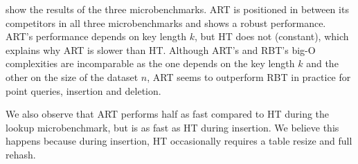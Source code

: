 \documentclass[abstracton,12pt]{scrartcl}
\theoremstyle{definition}
\begin{document}
show the results of the three microbenchmarks. ART is positioned in between 
its competitors in all three microbenchmarks and shows a robust performance.
ART's performance depends on key length $k$, but HT does not (constant), which 
explains why ART is slower than HT. Although ART's and RBT's big-O complexities 
are incomparable as the one depends on the key length $k$ and the other on the 
size of the dataset $n$, ART seems to outperform RBT in practice for point 
queries, insertion and deletion.

We also observe that ART performs half as fast compared to HT during the 
lookup microbenchmark, but is as fast as HT during insertion.
We believe this happens because during insertion, HT occasionally 
requires a table resize and full rehash.
\end{document}

